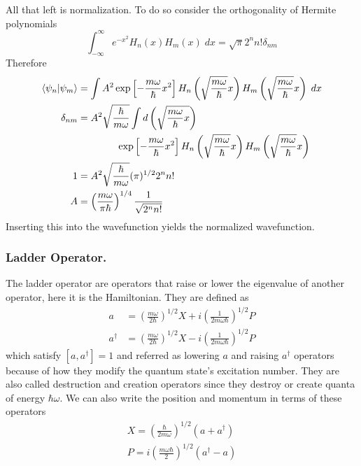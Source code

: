 \documentclass[../../../main.tex]{subfiles}
\begin{document}
All that left is normalization.
To do so consider the orthogonality of Hermite polynomials
\begin{equation*}
  \int_{-\infty}^{\infty}e^{-x^2}H_n(x)H_m(x)\;dx=\sqrt{\pi}2^n n!\delta_{nm}
\end{equation*}
Therefore
\begin{align*}
  \braket{\psi_n|\psi_m}
    & = \int A^2\exp \left[ -\frac{m\omega }{ \hbar}x^2 \right]
  H_n  \left( \sqrt{\frac{m \omega }{\hbar }} x \right)
  H_m  \left( \sqrt{\frac{m \omega }{\hbar }} x \right)
  \;dx                                                                                          \\
  \delta_{nm}
    & = A^2 \sqrt{\frac{\hbar }{m\omega}}  \int d \left( \sqrt{\frac{m\omega }{\hbar}x} \right) \\
    & \qquad\qquad\exp \left[ -\frac{m\omega }{ \hbar}x^2 \right]
  H_n  \left( \sqrt{\frac{m \omega }{\hbar }} x \right)
  H_m  \left( \sqrt{\frac{m \omega }{\hbar }} x \right)                                         \\
  1 & = A^2  \sqrt{\frac{\hbar }{m\omega }}(\pi)^{1/2}2^nn!                                     \\
  A & =  \left( \frac{m \omega}{\pi \hbar} \right)^{1/4} \frac{1}{\sqrt{2^n n!}}
\end{align*}
Inserting this into the wavefunction yields the normalized wavefunction.

\subsubsection{Ladder Operator.}
The ladder operator are operators that raise or lower the eigenvalue of another operator, here it is the Hamiltonian.
They are defined as
\begin{align*}
  a           & =  \left( \frac{m \omega}{2 \hbar} \right)^{1/2} X + i \left( \frac{1}{2 m \omega \hbar} \right)^{1/2} P \\
  a^{\dagger} & =  \left( \frac{m \omega}{2 \hbar} \right)^{1/2} X - i \left( \frac{1}{2 m \omega \hbar} \right)^{1/2} P
\end{align*}
which satisfy $[a,a^\dagger]=1$ and referred as lowering $a$  and raising $a^\dagger$  operators because of how they modify the quantum state’s excitation number.
They are also called destruction and creation operators since they destroy or create quanta of energy $\hbar \omega$.
We can also write the position and momentum in terms of these operators
\begin{gather*}
  X = \left( \frac{\hbar}{2m\omega} \right)^{1/2} (a + a^{\dagger}) \\
  P = i \left( \frac{m \omega \hbar}{2} \right)^{1/2} (a^{\dagger} - a)
\end{gather*}
\end{document}
